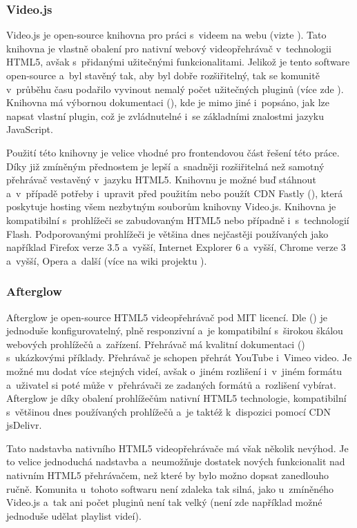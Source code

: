 \documentclass[thesis=M,czech]{FITthesis}[2012/06/26]
\begin{document}
\subsubsection{Video.js} \label{subsubsec:analyza_reseni_videojs}
Video.js je open-source knihovna pro práci s~videem na webu (vizte \cite{videojs_web}). Tato knihovna je vlastně obalení pro nativní webový videopřehrávač v~technologii HTML5, avšak s~přidanými užitečnými funkcionalitami. Jelikož je tento software open-source a~byl stavěný tak, aby byl dobře rozšiřitelný, tak se komunitě v~průběhu času podařilo vyvinout nemalý počet užitečných pluginů (více zde \cite{videojs_plg}). Knihovna má výbornou dokumentaci (\cite{videojs_doc}), kde je mimo jiné i~popsáno, jak lze napsat vlastní plugin, což je zvládnutelné i~se základními znalostmi jazyku JavaScript. 
	
	Použití této knihovny je velice vhodné pro frontendovou část řešení této práce. Díky již zmíněným přednostem je lepší a~snadněji rozšiřitelná než samotný přehrávač vestavěný v~jazyku HTML5. Knihovnu je možné buď stáhnout a~v~případě potřeby i~upravit před použitím nebo použít CDN Fastly (\cite{fastly_cdn}), která poskytuje hosting všem nezbytným souborům knihovny Video.js. Knihovna je kompatibilní s~prohlížeči se zabudovaným HTML5 nebo případně i~s~technologií Flash. Podporovanými prohlížeči je většina dnes nejčastěji používaných jako například Firefox verze 3.5 a~vyšší, Internet Explorer 6 a~vyšší, Chrome verze 3 a~vyšší, Opera a~další (více na wiki projektu \cite{videojs_wiki}).

\subsubsection{Afterglow} \label{subsubsec:analyza_reseni_afterglow}
Afterglow je open-source HTML5 videopřehrávač pod MIT licencí. Dle (\cite{afterglow}) je jednoduše konfigurovatelný, plně responzivní a~je kompatibilní s~širokou škálou webových prohlížečů a~zařízení. Přehrávač má kvalitní dokumentaci (\cite{afterglow_doc}) s~ukázkovými příklady. Přehrávač je schopen přehrát YouTube i~Vimeo video. Je možné mu dodat více stejných videí, avšak o~jiném rozlišení i~v~jiném formátu a~uživatel si poté může v~přehrávači ze zadaných formátů a~rozlišení vybírat. Afterglow je díky obalení prohlížečům nativní HTML5 technologie, kompatibilní s~většinou dnes používaných prohlížečů a~je taktéž k~dispozici pomocí CDN jsDelivr.
	
	Tato nadstavba nativního HTML5 videopřehrávače má však několik nevýhod. Je to velice jednoduchá nadstavba a~neumožňuje dostatek nových funkcionalit nad nativním HTML5 přehrávačem, než které by bylo možno dopsat zanedlouho ručně. Komunita u~tohoto softwaru není zdaleka tak silná, jako u~zmíněného Video.js a~tak ani počet pluginů není tak velký (není zde například možné jednoduše udělat playlist videí).
\end{document}
